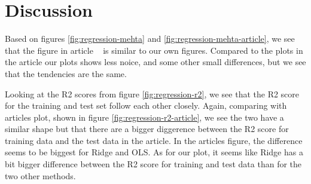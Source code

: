 \section{Discussion}
Based on figures \ref{fig:regression-mehta} and 
\ref{fig:regression-mehta-article}, we see that the figure in article 
~\cite{HighBias} is similar to our own figures. 
Compared to the plots in the article our plots shows less noice, 
and some other small differences, but we see that the tendencies are the same.

Looking at the R2 scores from figure \ref{fig:regression-r2}, we see 
that the R2 score for the training and test set follow each other closely. 
Again, comparing with articles plot, shown in figure 
\ref{fig:regression-r2-article}, we see the two have a similar shape 
but that there are a bigger diggerence between the R2 score for training 
data and the test data in the article. 
In the articles figure, the difference seems to be biggest for Ridge and 
OLS. As for our plot, it seems like Ridge has a bit bigger difference 
between the R2 score for training and test data than for the two other 
methods. 


